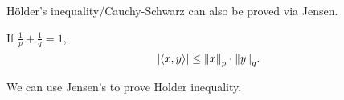 \documentclass[class=article,crop=false]{standalone}
\begin{document}
\begin{remark}
	H\"{o}lder's inequality/Cauchy-Schwarz can also be proved via Jensen.
\end{remark}
\begin{thm}
If $ \frac{1}{p} + \frac{1}{q} = 1$,
\[
|\langle x,y \rangle| \leq {\left\lVert{ x}\right\rVert}_p \cdot {\left\lVert{ y}\right\rVert}_q  
.\] 
\end{thm}

\begin{remark}
We can use Jensen's to prove Holder inequality.
\end{remark}
\end{document}
